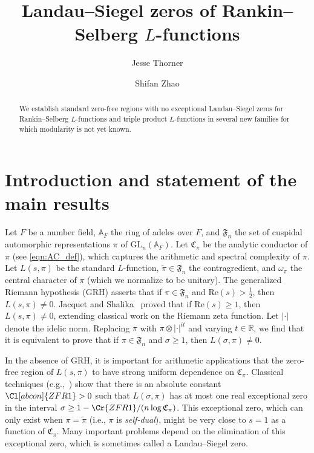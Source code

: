 \documentclass[11pt]{amsart}
\title[Landau--Siegel zeros of Rankin--Selberg $L$-functions]{Landau--Siegel zeros of Rankin--Selberg $L$-functions}
\author{Jesse Thorner}
\author{Shifan Zhao}
\theoremstyle{remark}
\newcommand{\R}{\mathbb{R}}
\renewcommand{\tilde}{\widetilde}
\numberwithin{equation}{section}
\begin{document}
\begin{abstract}
We establish standard zero-free regions with no exceptional Landau--Siegel zeros for Rankin--Selberg $L$-functions and triple product $L$-functions in several new families for which modularity is not yet known.
\end{abstract}

\maketitle


\section{Introduction and statement of the main results}
\label{sec:intro}

Let $F$ be a number field, $\mathbb{A}_F$ the ring of adeles over $F$, and $\mathfrak{F}_{n}$ the set of cuspidal automorphic representations $\pi$ of $\mathrm{GL}_{n}(\mathbb{A}_F)$.  Let $\mathfrak{C}_{\pi}$ be the analytic conductor of $\pi$ (see \eqref{eqn:AC_def}), which captures the arithmetic and spectral complexity of $\pi$.  Let $L(s,\pi)$ be the standard $L$-function, $\widetilde{\pi}\in\mathfrak{F}_{n}$ the contragredient, and $\omega_{\pi}$ the central character of $\pi$ (which we normalize to be unitary).  The generalized Riemann hypothesis (GRH) asserts that if $\pi\in\mathfrak{F}_{n}$ and $\mathrm{Re}(s)>\frac{1}{2}$, then $L(s,\pi)\neq 0$.  Jacquet and Shalika~\cite{JS} proved that if $\mathrm{Re}(s)\geq 1$, then $L(s,\pi)\neq 0$, extending classical work on the Riemann zeta function.  Let $|\cdot|$ denote the idelic norm.  Replacing $\pi$ with $\pi\otimes|\cdot|^{it}$ and varying $t\in\R$, we find that it is equivalent to prove that if $\pi\in\mathfrak{F}_{n}$ and $\sigma\geq 1$, then $L(\sigma,\pi)\neq 0$.

In the absence of GRH, it is important for arithmetic applications that the zero-free region of $L(s,\pi)$ to have strong uniform dependence on $\mathfrak{C}_{\pi}$.  Classical techniques (e.g.,~\cite{Wattanawanichkul}) show that there is an absolute constant $\Cl[abcon]{ZFR1}>0$ such that $L(\sigma,\pi)$ has at most one real exceptional zero in the interval $\sigma\geq  1-\Cr{ZFR1}/(n\log \mathfrak{C}_{\pi})$.  This exceptional zero, which can only exist when $\pi=\tilde{\pi}$ (i.e., $\pi$ is {\it self-dual}), might be very close to $s=1$ as a function of $\mathfrak{C}_{\pi}$.  Many important problems depend on the elimination of this exceptional zero, which is sometimes called a Landau--Siegel zero.
\end{document}
